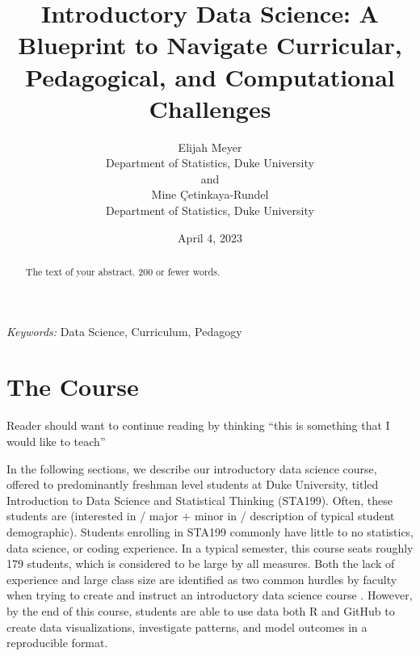 \documentclass[
  12pt]{article}
\begin{document}
\def\spacingset#1{\renewcommand{\baselinestretch}%
{#1}\small\normalsize} \spacingset{1}



\date{April 4, 2023}
\title{\bf Introductory Data Science: A Blueprint to Navigate
Curricular, Pedagogical, and Computational Challenges}
\author{
Elijah Meyer\\
Department of Statistics, Duke University\\
and\\Mine Çetinkaya-Rundel\\
Department of Statistics, Duke University\\
}
\maketitle

\bigskip
\bigskip
\begin{abstract}
The text of your abstract. 200 or fewer words.
\end{abstract}

\noindent%
{\it Keywords:} Data Science, Curriculum, Pedagogy
\vfill

\newpage
\spacingset{1.9} %
\ifdefined\Shaded\renewenvironment{Shaded}{\begin{tcolorbox}[boxrule=0pt, frame hidden, interior hidden, enhanced, breakable, sharp corners, borderline west={3pt}{0pt}{shadecolor}]}{\end{tcolorbox}}\fi

\hypertarget{sec-course}{%
\section{The Course}\label{sec-course}}

Reader should want to continue reading by thinking ``this is something
that I would like to teach''

In the following sections, we describe our introductory data science
course, offered to predominantly freshman level students at Duke
University, titled Introduction to Data Science and Statistical Thinking
(STA199). Often, these students are (interested in / major + minor in /
description of typical student demographic). Students enrolling in
STA199 commonly have little to no statistics, data science, or coding
experience. In a typical semester, this course seats roughly 179
students, which is considered to be large by all measures. Both the lack
of experience and large class size are identified as two common hurdles
by faculty when trying to create and instruct an introductory data
science course \citep{Schwab2020, Kok_2008}. However, by the end of this
course, students are able to use data both R and GitHub to create data
visualizations, investigate patterns, and model outcomes in a
reproducible format.
\end{document}
